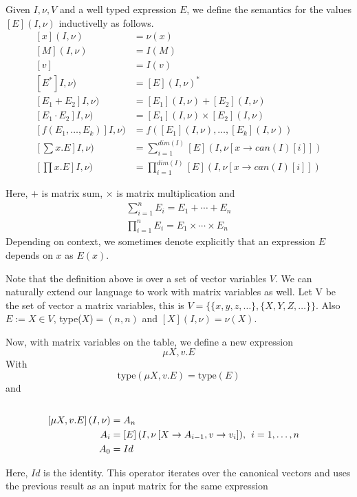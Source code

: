 Given $I, \nu, V$ and a well typed expression $E$, we define the semantics for the values $\left[ E\right](I,\nu)$ inductivelly as follows.
\begin{align*}
\left[ x\right](I,\nu)&=\nu (x)\\
\left[ M\right](I,\nu)&=I(M) \\
\left[ v\right]&=I(v) \\
\left[ E^*\right]I,\nu)&=\left[ E\right](I,\nu)^* \\
\left[ E_1+E_2\right]I,\nu)&= \left[ E_1\right](I,\nu)+\left[ E_2\right](I,\nu)\\
\left[ E_1\cdot E_2\right]I,\nu)&= \left[ E_1\right](I,\nu)\times \left[ E_2\right](I,\nu)\\
\left[ f(E_1,\ldots ,E_k)\right]I,\nu) &= f\left(\left[ E_1\right](I,\nu),\ldots , \left[  E_k\right](I,\nu)\right)\\
\left[ \sum x.E\right]I,\nu)&= \sum_{i=1}^{dim(I)}\left[ E\right](I, \nu [x\rightarrow can(I)[i]])\\
\left[ \prod x. E\right]I,\nu)&= \prod_{i=1}^{dim(I)}\left[ E\right](I, \nu [x\rightarrow can(I)[i]])
\end{align*}

Here, $+$ is matrix sum, $\times$ is matrix multiplication and 
\begin{align*}
\sum_{i=1}^n E_i = E_1+\cdots + E_n \\
\prod_{i=1}^n E_i = E_1\times \cdots\times E_n
\end{align*}
Depending on context, we sometimes denote explicitly that an expression $E$ depends on $x$ as $E(x)$.

Note that the definition above is over a set of vector variables $V$. We can naturally extend our language to work with matrix variables as well. Let V be the set of vector a matrix variables, this is $V=\lbrace\lbrace x, y, z, \ldots\rbrace,\lbrace X,Y,Z,\ldots\rbrace\rbrace$. Also $E:=X\in V$, type($X$)$=(n, n)$ and $\left[X\right](I,\nu)=\nu(X)$.

Now, with matrix variables on the table, we define a new expression $$\mu X, v.E$$ With $$\text{type}(\mu X,v. E) = \text{type}(E)$$ and
\begin{align*}
\\
\left[ \mu X,v. E\right](I,\nu) &= A_n \\
A_i &= \left[ E\right](I,\nu\left[X\rightarrow A_{i-1}, v\rightarrow v_i\right]),\hspace{1ex} i= 1, \ldots, n \\
A_0 &= Id
\end{align*}

Here, $Id$ is the identity. This operator iterates over the canonical vectors and uses the previous result as an input matrix for the same expression
